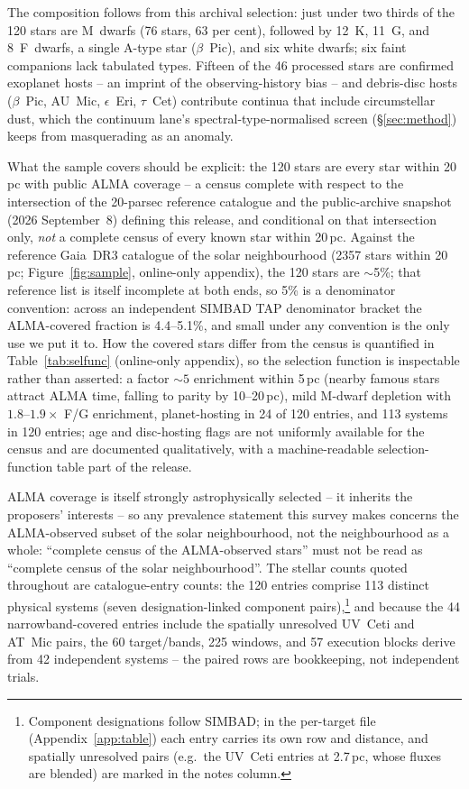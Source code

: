 \documentclass{openjournal}
\begin{document}
The composition follows from this archival selection: just under two
thirds of the 120 stars are M~dwarfs (76 stars, 63 per cent),
followed by 12~K, 11~G, and 8~F~dwarfs, a single A-type star
($\beta$~Pic), and six white dwarfs; six faint companions lack
tabulated types. Fifteen of the 46 processed stars are confirmed
exoplanet hosts -- an imprint of the observing-history bias -- and
debris-disc hosts ($\beta$~Pic, AU~Mic, $\epsilon$~Eri, $\tau$~Cet)
contribute continua that include circumstellar dust, which the
continuum lane's spectral-type-normalised screen (\S\ref{sec:method})
keeps from masquerading as an anomaly.

What the sample covers should be explicit: the 120 stars are every
star within 20\,pc with public ALMA coverage -- a census complete with
respect to the intersection of the 20-parsec reference catalogue and
the public-archive snapshot (2026 September~8) defining this release,
and conditional on that intersection only, \emph{not} a complete
census of every known star within 20\,pc. Against the
reference Gaia~DR3 catalogue of the solar neighbourhood (2357 stars
within 20\,pc; Figure~\ref{fig:sample}, online-only appendix), the
120 stars are $\sim$5\%; that reference list is itself incomplete at
both ends, so 5\% is a denominator convention: across an independent
SIMBAD TAP denominator bracket the ALMA-covered fraction is
4.4--5.1\%, and small under any convention is the only use we put it
to. How the covered stars differ from the census is quantified in
Table~\ref{tab:selfunc} (online-only appendix), so the selection
function is inspectable rather than asserted: a factor ${\sim}5$
enrichment within 5\,pc (nearby famous stars attract ALMA time,
falling to parity by 10--20\,pc), mild M-dwarf depletion with
$1.8$--$1.9\times$ F/G enrichment, planet-hosting in 24 of 120
entries, and 113 systems in 120 entries; age and disc-hosting flags
are not uniformly available for the census and are documented
qualitatively, with a machine-readable selection-function table part
of the release.

ALMA coverage is itself strongly astrophysically selected -- it
inherits the proposers' interests -- so any prevalence statement this
survey makes concerns the ALMA-observed subset of the solar
neighbourhood, not the neighbourhood as a whole: ``complete census of
the ALMA-observed stars'' must not be read as ``complete census of the
solar neighbourhood''. The stellar counts quoted throughout are
catalogue-entry counts: the 120 entries comprise 113 distinct physical
systems (seven designation-linked component
pairs),\footnote{Component designations follow SIMBAD; in
the per-target file (Appendix~\ref{app:table}) each entry carries its own row and distance, and
spatially unresolved pairs (e.g.\ the UV~Ceti entries at 2.7\,pc,
whose fluxes are blended) are marked in the notes column.} and because
the 44 narrowband-covered entries include the spatially unresolved
UV~Ceti and AT~Mic pairs, the 60 target/bands, 225 windows, and 57
execution blocks derive from 42 independent systems -- the paired rows
are bookkeeping, not independent trials.
\end{document}
